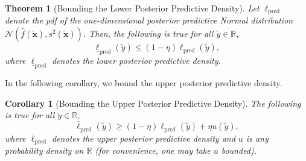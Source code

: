\documentclass[12pt, english, oneside, a4paper]{article}
\newtheorem{theorem}{Theorem}%
\newtheorem{corollary}{Corollary}[theorem]
\newcommand{\x}{\boldsymbol{x}}
\begin{document}
\begin{theorem}[Bounding the Lower Posterior Predictive Density]\label{main_th}
    Let $\ell_\text{pred}$ denote the pdf of the one-dimensional posterior predictive Normal distribution 
    $\mathcal{N}(\hat{f}(\tilde{\x}),s^2(\tilde{\x}))$. Then, the following is true for all $\tilde y \in \mathbb R$,
    $$\underline{\ell}_\text{pred}(\tilde y) \leq (1-\eta) \ell_\text{pred} (\tilde y),$$
    where $\underline{\ell}_\text{pred}$ denotes the lower posterior predictive density.
\end{theorem}

In the following corollary, we bound the upper posterior predictive density. 





\begin{corollary}[Bounding the Upper Posterior Predictive Density]\label{cor-1}
    The following is true for all $\tilde{y}\in\mathbb{R}$,
    \[
    \overline{\ell}_\text{pred}(\tilde{y}) \ge (1-\eta) \ell_\text{pred}(\tilde{y}) + \eta u(\tilde{y}),
    \]
    where $\overline{\ell}_\text{pred}$ denotes the upper posterior predictive density and
    $u$ is any probability density on $\mathbb{R}$ (for convenience, one may take $u$ bounded).
\end{corollary}
\end{document}
